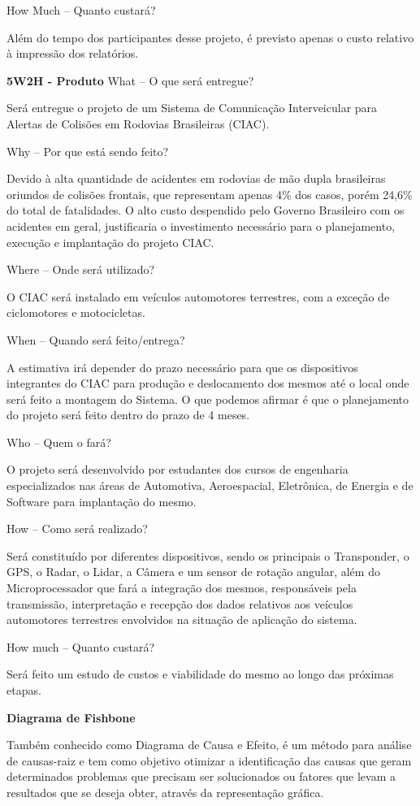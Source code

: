How Much – Quanto custará?

Além do tempo dos participantes desse projeto, é previsto apenas o custo relativo à impressão dos relatórios.


\textbf{5W2H - Produto}
What – O que será entregue?

Será entregue o projeto de um Sistema de Comunicação Interveicular para Alertas de Colisões em Rodovias Brasileiras (CIAC).

Why – Por que está sendo feito?

Devido à alta quantidade de acidentes em rodovias de mão dupla brasileiras oriundos de colisões frontais, que representam apenas 4\% dos casos, porém 24,6\% do total de fatalidades. O alto custo despendido pelo Governo Brasileiro com os acidentes em geral, justificaria o investimento necessário para o planejamento, execução e implantação do projeto CIAC.

Where – Onde será utilizado?

O CIAC será instalado em veículos automotores terrestres, com a exceção de ciclomotores e motocicletas.

When – Quando será feito/entrega?

A estimativa irá depender do prazo necessário para que os dispositivos integrantes do CIAC para produção e deslocamento dos mesmos até o local onde será feito a montagem do Sistema. O que podemos afirmar é que o planejamento do projeto será feito dentro do prazo de 4 meses.

Who – Quem o fará?

O projeto será desenvolvido por estudantes dos cursos de engenharia especializados nas áreas de Automotiva, Aeroespacial, Eletrônica, de Energia e de Software para implantação do mesmo.

How – Como será realizado?

Será constituído por diferentes dispositivos, sendo os principais o Transponder, o GPS, o Radar, o Lidar, a Câmera e um sensor de rotação angular, além do Microprocessador que fará a integração dos mesmos, responsáveis pela transmissão, interpretação e recepção dos dados relativos aos veículos automotores terrestres envolvidos na situação de aplicação do sistema.

How much – Quanto custará?

Será feito um estudo de custos e viabilidade do mesmo ao longo das próximas etapas.

\textbf{Diagrama de Fishbone}

Também conhecido como Diagrama de Causa e Efeito, é um método para análise de causas-raiz e tem como objetivo otimizar a identificação das causas que geram determinados problemas que precisam ser solucionados ou fatores que levam a resultados que se deseja obter, através da representação gráfica.

